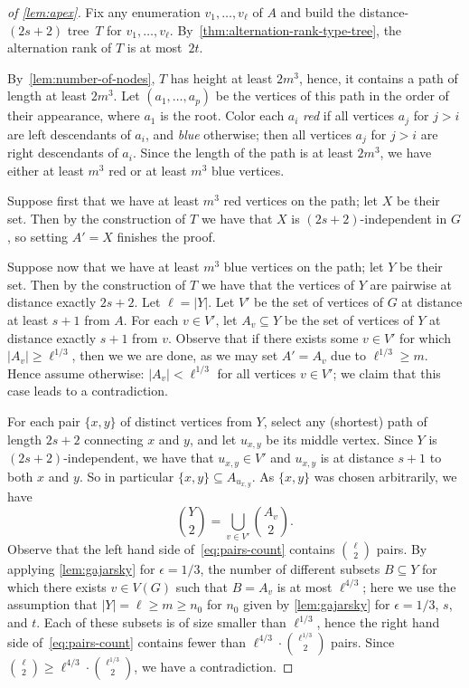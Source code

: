 \begin{proof}[of \cref{lem:apex}]
Fix any enumeration $v_1,\ldots, v_\ell$ of $A$ and
build the distance-$(2s+2)$ tree~$T$ for
$v_1,\ldots,v_\ell$. By~\cref{thm:alternation-rank-type-tree}, 
the alternation rank of $T$ is at most~$2t$. 

By~\cref{lem:number-of-nodes}, $T$ has height at least $2m^3$, hence, 
it contains a path of length at least $2m^3$. 
Let $(a_1,\ldots,a_p)$ be the vertices of this path in the order of their appearance, where $a_1$ is the root.
Color each $a_i$ {\em{red}} if all vertices $a_j$ for $j>i$ are left descendants of $a_i$, and {\em{blue}} otherwise; then all vertices $a_j$ for $j>i$ are right descendants of $a_i$.
Since the length of the path is at least $2m^3$, we have either at least $m^3$ red or at least $m^3$ blue vertices.

Suppose first that we have at least $m^3$ red vertices on the path; let $X$ be their set.
Then by the construction of $T$ we have that $X$ is $(2s+2)$-independent in $G$, so setting $A'=X$ finishes the proof.

Suppose now that we have at least $m^3$ blue vertices on the path; let $Y$ be their set.
Then by the construction of $T$ we have that the vertices of $Y$ are pairwise at distance exactly $2s+2$. 
Let $\ell=|Y|$. 
Let $V'$ be the set of vertices of $G$ at distance at least $s+1$ from $A$.
For each $v\in V'$, let $A_v\subseteq Y$ be the set of vertices of $Y$ at distance exactly $s+1$ from $v$.
Observe that if there exists some $v\in V'$ for which $|A_v|\geq \ell^{1/3}$, then we we are done, as we may set $A'=A_v$ due to $\ell^{1/3}\geq m$.
Hence assume otherwise: $|A_v|<\ell^{1/3}$ for all vertices $v\in V'$; we claim that this case leads to a contradiction.

For each pair $\{x,y\}$ of distinct vertices from $Y$, select any (shortest) path of length $2s+2$ connecting $x$ and $y$, and let $u_{x,y}$ be its middle vertex.
Since $Y$ is $(2s+2)$-independent, we have that $u_{x,y}\in V'$ and $u_{x,y}$ is at distance $s+1$ to both $x$ and $y$. So in particular $\{x,y\}\subseteq A_{u_{x,y}}$.
As $\{x,y\}$ was chosen arbitrarily, we have
\begin{equation}\label{eq:pairs-count}
\binom{Y}{2}=\bigcup_{v\in V'} \binom{A_v}{2}.
\end{equation}
Observe that the left hand side of~\eqref{eq:pairs-count} contains $\binom{\ell}{2}$ pairs.
By applying \cref{lem:gajarsky} for $\epsilon=1/3$, the number of different subsets $B\subseteq Y$ 
for which there exists $v\in V(G)$ such that $B=A_v$ is at most $\ell^{4/3}$; here we use the assumption that $|Y|=\ell\geq m\geq n_0$ for $n_0$ given by \cref{lem:gajarsky} for $\epsilon=1/3$, $s$, and $t$.
Each of these subsets is of size smaller than $\ell^{1/3}$, hence the right hand side of~\eqref{eq:pairs-count} contains fewer than $\ell^{4/3}\cdot \binom{\ell^{1/3}}{2}$ pairs.
Since $\binom{\ell}{2}\geq \ell^{4/3}\cdot \binom{\ell^{1/3}}{2}$, we have a contradiction.
\end{proof}

